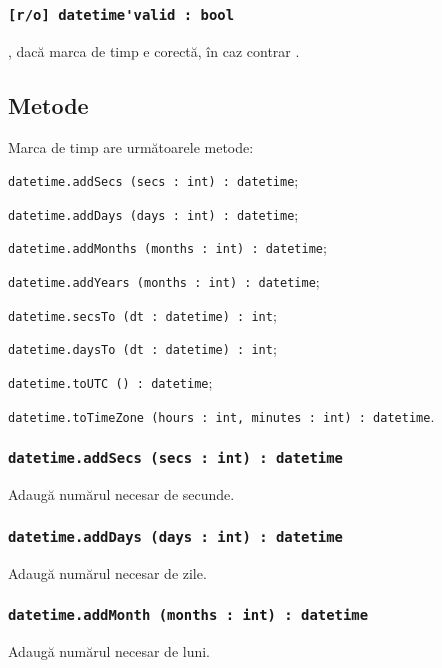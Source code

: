 \subsubsection{\lstinline|[r/o] datetime'valid : bool|}

\true, dacă marca de timp e corectă, în caz contrar \false.

\subsection{Metode}

Marca de timp are următoarele metode:
\begin{icItems}
	\item \lstinline|datetime.addSecs (secs : int) : datetime|;
	\item \lstinline|datetime.addDays (days : int) : datetime|;
	\item \lstinline|datetime.addMonths (months : int) : datetime|;
	\item \lstinline|datetime.addYears (months : int) : datetime|;
	\item \lstinline|datetime.secsTo (dt : datetime) : int|;
	\item \lstinline|datetime.daysTo (dt : datetime) : int|;
	\item \lstinline|datetime.toUTC () : datetime|;
	\item \lstinline|datetime.toTimeZone (hours : int, minutes : int) : datetime|.
\end{icItems}

\subsubsection{\lstinline|datetime.addSecs (secs : int) : datetime|}

Adaugă numărul necesar de secunde.

\subsubsection{\lstinline|datetime.addDays (days : int) : datetime|}

Adaugă numărul necesar de zile.

\subsubsection{\lstinline|datetime.addMonth (months : int) : datetime|}

Adaugă numărul necesar de luni.

